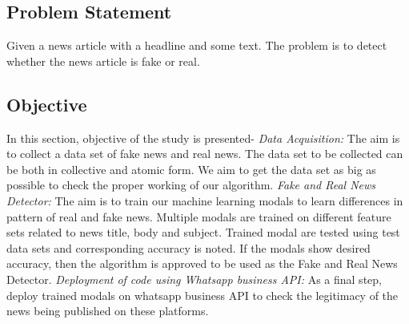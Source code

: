 \documentclass[runningheads]{llncs}
\begin{document}




\subsection{Problem Statement}
 \newline

Given a news article with a headline and some text. The problem is to detect whether the news article is fake or real.

\subsection{Objective}
 \newline
 
In this section, objective of the study is presented-
\newline
\newline
 \emph{Data Acquisition:} The aim is to collect a data set of fake news and real news. The data set to be collected can be both in collective and atomic form. We aim to get the data set as big as possible to check the proper working of our algorithm.
\newline 
\newline
 \emph{Fake and Real News Detector:} The aim is to train our machine learning modals to learn differences in pattern of real and fake news. 
Multiple modals are trained on different feature sets related to news title, body and subject. Trained modal are tested using test data sets and corresponding accuracy is noted. If the modals show desired accuracy, then the algorithm is approved to be used as the Fake and Real News Detector. 
\newline
\newline
 \emph{Deployment of code using Whatsapp business API:} As a final step, deploy trained modals on whatsapp business API to check the legitimacy of the news being published on these platforms.
\end{document}
